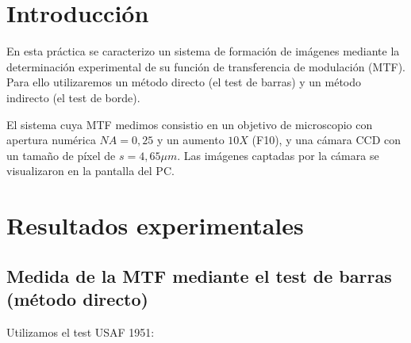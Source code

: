 \documentclass[12pt,a5paper]{article}
\begin{document}



\tableofcontents



\section{Introducción}
En esta práctica se caracterizo un sistema de formación de imágenes mediante la determinación experimental de su función de transferencia de modulación (MTF). Para ello utilizaremos un método directo (el test de barras) y un método indirecto (el test de borde). \par

El sistema cuya MTF medimos consistio en un objetivo de microscopio con apertura numérica $NA = 0,25$ y un aumento $10X$ (F10), y una cámara CCD con un tamaño de píxel de $s=4,65 \mu m$. Las imágenes captadas por la cámara se visualizaron en la pantalla del PC.



\section{Resultados experimentales}


\subsection{Medida de la MTF mediante el test de barras (método directo)}

Utilizamos el test USAF 1951:
\end{document}

